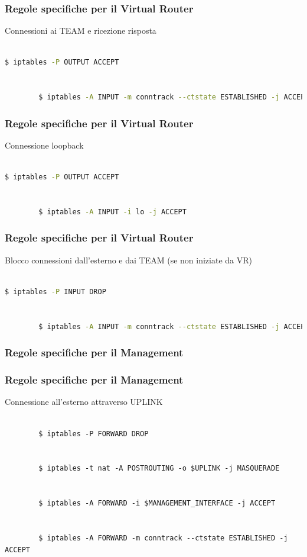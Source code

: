 \documentclass{beamer}
\begin{document}
\begin{frame}[fragile]
    \frametitle{Regole specifiche per il Virtual Router}
    Connessioni ai TEAM e ricezione risposta
    \\~\\
    \begin{lstlisting}[language=sh]
        $ iptables -P OUTPUT ACCEPT
        
        
        $ iptables -A INPUT -m conntrack --ctstate ESTABLISHED -j ACCEPT           
    \end{lstlisting}
\end{frame}

\begin{frame}[fragile]
    \frametitle{Regole specifiche per il Virtual Router}
    Connessione loopback
    \\~\\
    \begin{lstlisting}[language=sh]
        $ iptables -P OUTPUT ACCEPT


        $ iptables -A INPUT -i lo -j ACCEPT           
    \end{lstlisting}
\end{frame}

\begin{frame}[fragile]
    \frametitle{Regole specifiche per il Virtual Router}
    Blocco connessioni dall'esterno e dai TEAM (se non iniziate da VR)
    \\~\\
    \begin{lstlisting}[language=sh]
        $ iptables -P INPUT DROP


        $ iptables -A INPUT -m conntrack --ctstate ESTABLISHED -j ACCEPT
    \end{lstlisting}
\end{frame}


\subsubsection{Regole specifiche per il Management}
\begin{frame}[fragile]
    \frametitle{Regole specifiche per il Management}
    Connessione all'esterno attraverso UPLINK
    \\~\\
    \begin{lstlisting}
        $ iptables -P FORWARD DROP

        
        $ iptables -t nat -A POSTROUTING -o $UPLINK -j MASQUERADE
        
        
        $ iptables -A FORWARD -i $MANAGEMENT_INTERFACE -j ACCEPT
        
        
        $ iptables -A FORWARD -m conntrack --ctstate ESTABLISHED -j ACCEPT
    \end{lstlisting}
\end{frame}
\end{document}
